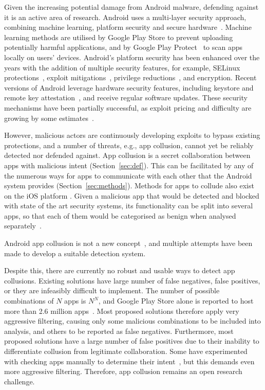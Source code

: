 \documentclass[article, oneside]{aaltoseries}
\newcommand{\TODO}[1]{\todo[inline]{#1}}
\newcommand{\Sref}[1]{Section~\ref{#1}}
\begin{document}
Given the increasing potential damage from Android malware, defending against it is an active area of research. Android uses a multi-layer security approach, combining machine learning, platform security and secure hardware~\cite{AOSP2018}. Machine learning methods are utilised by Google Play Store to prevent uploading potentially harmful applications, and by Google Play Protect~\cite{AOSPplayprotect} to scan apps locally on users' devices. Android's platform security has been enhanced over the years with the addition of multiple security features, for example, SELinux protections~\cite{AOSPselinux}, exploit mitigations~\cite{Edge2016}, privilege reductions~\cite{Lawrence2017}, and encryption. Recent versions of Android leverage hardware security features, including keystore and remote key attestation~\cite{Willden2017}, and receive regular software updates. These security mechanisms have been partially successful, as exploit pricing and difficulty are growing by some estimates~\cite{AOSP2018}.

However, malicious actors are continuously developing exploits to bypass existing protections, and a number of threats, e.g., app collusion, cannot yet be reliably detected nor defended against. App collusion is a secret collaboration between apps with malicious intent  (\Sref{sec:def}). This can be facilitated by any of the numerous ways for apps to communicate with each other that the Android system provides (\Sref{sec:methods}). Methods for apps to collude also exist on the iOS platform \cite{Deshotels2016}. Given a malicious app that would be detected and blocked with state of the art security systems, its functionality can be split into several apps, so that each of them would be categorised as benign when analysed separately~\cite{Chen2018}.

Android app collusion is not a new concept~\cite{Schlegel2011}, and multiple attempts have been made to develop a suitable detection system. \TODO{brief overview of existing approaches based on \Sref{sec:approaches}}

Despite this, there are currently no robust and usable ways to detect app collusions. Existing solutions have large number of false negatives, false positives, or they are infeasibly difficult to implement. The number of possible combinations of $N$ apps is $N^N$, and Google Play Store alone is reported to host more than 2.6 million apps~\cite{Statista2018}. Most proposed solutions therefore apply very aggressive filtering, causing only some malicious combinations to be included into analysis, and others to be reported as false negatives. Furthermore, most proposed solutions have a large number of false positives due to their inability to differentiate collusion from legitimate collaboration. Some have experimented with checking apps manually to determine their intent~\cite{Muttik2016}, but this demands even more aggressive filtering. Therefore, app collusion remains an open research challenge.
\end{document}

